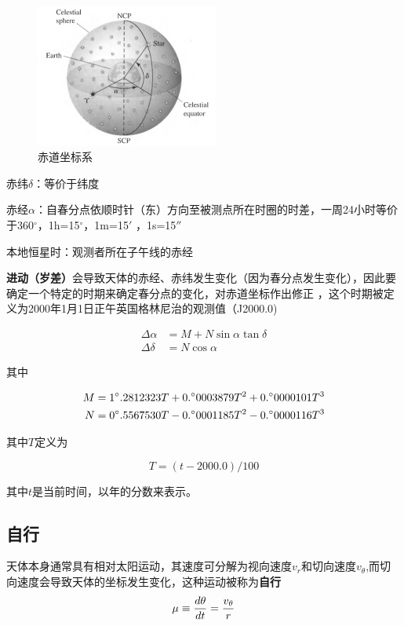 \documentclass[openany]{ctexbook}
\begin{document}
\begin{figure}[hbt]
  \centering
  \includegraphics[width=6cm]{chapters/01/equatorial}
  \caption{赤道坐标系}
  \label{fig:equatorial}
\end{figure}
赤纬$\delta$：等价于纬度

赤经$\alpha$：自春分点依顺时针（东）方向至被测点所在时圈的时差，一周24小时等价于360$^\circ$，1h=15$^\circ$，1m=15$'$
，1s=15$''$

本地恒星时：观测者所在子午线的赤经

{\bf
进动（岁差）}会导致天体的赤经、赤纬发生变化（因为春分点发生变化），因此要确定一个特定的时期来确定春分点的变化，对赤道坐标作出修正
，这个时期被定义为2000年1月1日正午英国格林尼治的观测值（J2000.0)

\begin{align}
  \Delta\alpha &=M+N \sin\alpha \tan\delta \\
  \Delta\delta &=N\cos\alpha
\end{align}

其中

\begin{align}
  M &=1^\circ.2812323T+0.^\circ0003879T^2+0.^\circ0000101T^3 \notag \\
  N &=0^\circ.5567530T-0.^\circ0001185T^2-0.^\circ0000116T^3 \notag
\end{align}

其中$T$定义为

\begin{equation}
  T=(t-2000.0)/100
\end{equation}

其中$t$是当前时间，以年的分数来表示。

\subsection{自行}
天体本身通常具有相对太阳运动，其速度可分解为视向速度$v_r$和切向速度$v_\theta$,而切向速度会导致天体的坐标发生变化，这种运动被称为{\bf 自行}
\begin{displaymath}
  \mu\equiv{d\theta\over dt} ={v_\theta \over r}
\end{displaymath}
\end{document}
